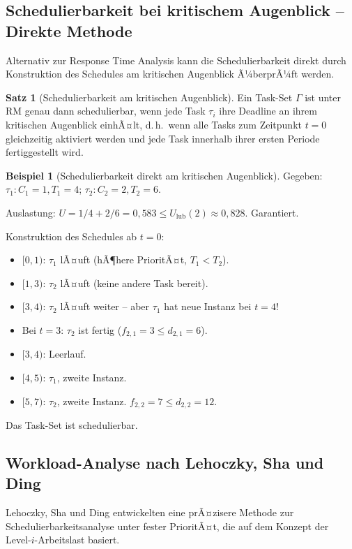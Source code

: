 ﻿\documentclass[a4paper,12pt]{report}
\theoremstyle{definition}
\newtheorem{beispiel}{Beispiel}[chapter]
\newtheorem{satz}{Satz}[chapter]
\begin{document}
\subsection{Schedulierbarkeit bei kritischem Augenblick -- Direkte Methode}

Alternativ zur Response Time Analysis kann die Schedulierbarkeit direkt durch
Konstruktion des Schedules am kritischen Augenblick Ã¼berprÃ¼ft werden.

\begin{satz}[Schedulierbarkeit am kritischen Augenblick]
	Ein Task-Set $\Gamma$ ist unter RM genau dann schedulierbar, wenn jede Task
	$\tau_i$ ihre Deadline an ihrem kritischen Augenblick einhÃ¤lt, d.\,h.\ wenn alle
	Tasks zum Zeitpunkt $t = 0$ gleichzeitig aktiviert werden und jede Task innerhalb
	ihrer ersten Periode fertiggestellt wird.
\end{satz}

\begin{beispiel}[Schedulierbarkeit direkt am kritischen Augenblick]
	Gegeben: $\tau_1: C_1=1, T_1=4$; $\tau_2: C_2=2, T_2=6$.

	Auslastung: $U = 1/4 + 2/6 = 0{,}583 \leq U_{\text{lub}}(2) \approx 0{,}828$. Garantiert.

	Konstruktion des Schedules ab $t=0$:
	\begin{itemize}
		\item $[0,1)$: $\tau_1$ lÃ¤uft (hÃ¶here PrioritÃ¤t, $T_1 < T_2$).
		\item $[1,3)$: $\tau_2$ lÃ¤uft (keine andere Task bereit).
		\item $[3,4)$: $\tau_2$ lÃ¤uft weiter -- aber $\tau_1$ hat neue Instanz bei $t=4$!
		\item Bei $t=3$: $\tau_2$ ist fertig ($f_{2,1}=3 \leq d_{2,1}=6$). \checkmark
		\item $[3,4)$: Leerlauf.
		\item $[4,5)$: $\tau_1$, zweite Instanz.
		\item $[5,7)$: $\tau_2$, zweite Instanz. $f_{2,2} = 7 \leq d_{2,2} = 12$. \checkmark
	\end{itemize}
	Das Task-Set ist schedulierbar.
\end{beispiel}

\subsection{Workload-Analyse nach Lehoczky, Sha und Ding}

Lehoczky, Sha und Ding \cite{Lehoczky1989} entwickelten eine prÃ¤zisere Methode
zur Schedulierbarkeitsanalyse unter fester PrioritÃ¤t, die auf dem Konzept der
Level-$i$-Arbeitslast basiert.
\end{document}
